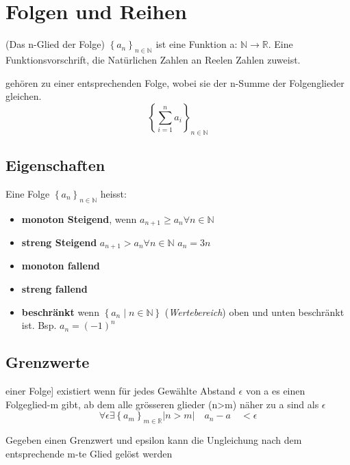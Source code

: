 
\section{Folgen und Reihen}
\begin{definition}
    [Folge] (Das n-Glied der Folge) ${\left\{a_n\right\}}_{n \in \mathbb{N}}$ ist eine Funktion a: $\mathbb{N} \rightarrow \mathbb{R}$. Eine Funktionsvorschrift, die Natürlichen Zahlen an Reelen Zahlen zuweist.
\end{definition}

\begin{definition}
    [Reihen] gehören zu einer entsprechenden Folge, wobei sie der n-Summe der Folgenglieder gleichen.
    \begin{equation}
        {\left\{\sum_{i=1}^{n} a_i\right\}}_{n \in \mathbb{N}}
    \end{equation}
\end{definition}

\subsection{Eigenschaften}

\begin{definition}
    Eine Folge ${\left\{a_n\right\}}_{n \in \mathbb{N}}$  heisst:
    \begin{itemize}
        \item \textbf{monoton Steigend}, wenn $a_{n+1} \ge a_n \forall n \in \mathbb{N}$
        \item \textbf{streng Steigend}  $a_{n+1} > a_n \forall n \in \mathbb{N}$
            \subitem $a_n = 3n$
        \item \textbf{monoton fallend}
        \item \textbf{streng fallend}
        \item \textbf{beschränkt}  wenn $\left\{a_n \mid n \in \mathbb{N} \right\}$ (\textit{Wertebereich}) oben und unten beschränkt ist.
            \subitem Bsp. $a_n = (-1)^n$  
    \end{itemize}
\end{definition}

\subsection{Grenzwerte}
\begin{definition}
    [Grenzwert [a] einer Folge] existiert wenn für jedes Gewählte Abstand $\epsilon$ von a es einen Folgeglied-m gibt, ab dem alle grösseren glieder (n>m) näher zu a sind als $\epsilon$
    \begin{equation}
        \forall \epsilon \exists \left\{a_m\right\}_{m\in\mathbb{R}} | n > m | \quad a_n - a \quad < \epsilon 
    \end{equation}
 
    Gegeben einen Grenzwert und epsilon kann die Ungleichung nach dem entsprechende m-te Glied gelöst werden
\end{definition}


